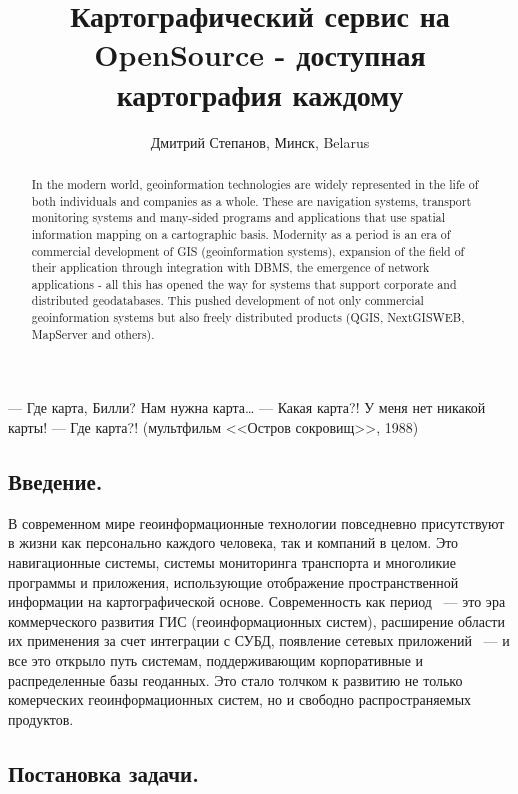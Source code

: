 \documentclass[10pt, a5paper]{article}
\begin{document}
\title{Картографический сервис на OpenSource - доступная картография каждому}
\author{Дмитрий Степанов, Минск, Belarus}
\maketitle
\begin{abstract}
In the modern world, geoinformation technologies are widely represented in the life of both individuals and companies as a whole. These are navigation systems, transport monitoring systems and many-sided programs and applications that use spatial information mapping on a cartographic basis. Modernity as a period is an era of commercial development of GIS \linebreak(geoinformation systems), expansion of the field of their application through integration with DBMS, the emergence of network applications - all this has opened the way for systems that support corporate and distributed geodatabases. This pushed development of not only commercial geoinformation systems but also freely \linebreak distributed products (QGIS, NextGISWEB, MapServer and others).
\end{abstract}
— Где карта, Билли? Нам нужна карта… 
— Какая карта?! У меня нет никакой карты!
— Где карта?!
(мультфильм <<Остров сокровищ>>, 1988)

\subsection*{Введение.}

В современном мире геоинформационные технологии повседневно присутствуют в жизни как персонально каждого человека, так и компаний в целом. Это навигационные системы, системы мониторинга транспорта и многоликие программы и приложения, использующие отображение пространственной информации на картографической основе. 
Современность как период ~--- это эра коммерческого развития ГИС (геоинформационных систем), расширение области их применения за счет интеграции с СУБД, появление сетевых приложений ~--- и все это открыло путь системам, поддерживающим корпоративные и распределенные базы геоданных.  Это стало толчком к развитию не только комерческих геоинформационных систем, но и свободно распространяемых продуктов.

\subsection*{Постановка задачи.}
\end{document}
